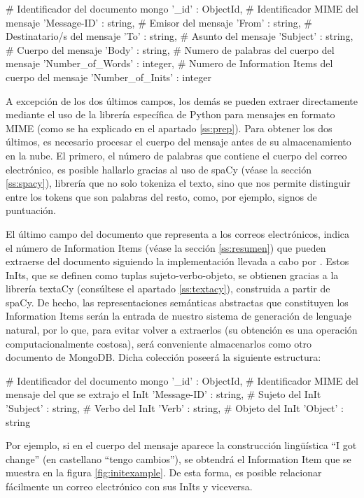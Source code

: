 \begin{python}
{
	# Identificador del documento mongo
	'_id' : ObjectId,
	# Identificador MIME del mensaje
	'Message-ID' : string,
	# Emisor del mensaje
	'From' : string,
	# Destinatario/s del mensaje
	'To' : string,
	# Asunto del mensaje
	'Subject' : string,
	# Cuerpo del mensaje
	'Body' : string,
	# Numero de palabras del cuerpo del mensaje
	'Number_of_Words' : integer,
	# Numero de Information Items del cuerpo del mensaje
	'Number_of_Inits' : integer
}
\end{python}

A excepción de los dos últimos campos, los demás se pueden extraer directamente mediante el uso de la librería específica de Python para mensajes en formato MIME (como se ha explicado en el apartado \ref{ss:prep}). Para obtener los dos últimos, es necesario procesar el cuerpo del mensaje antes de su almacenamiento en la nube. El primero, el número de palabras que contiene el cuerpo del correo electrónico, es posible hallarlo gracias al uso de spaCy (véase la sección \ref{ss:spacy}), librería que no solo tokeniza el texto, sino que nos permite distinguir entre los tokens que son palabras del resto, como, por ejemplo, signos de puntuación.

El último campo del documento que representa a los correos electrónicos, indica el número de Information Items (véase la sección \ref{ss:resumen}) que pueden extraerse del documento siguiendo la implementación llevada a cabo por \cite{genest2010text}. Estos InIts, que se definen como tuplas sujeto-verbo-objeto, se obtienen gracias a la librería textaCy (consúltese el apartado \ref{ss:textacy}), construida a partir de spaCy. De hecho, las representaciones semánticas abstractas que constituyen los Information Items serán la entrada de nuestro sistema de generación de lenguaje natural, por lo que, para evitar volver a extraerlos (su obtención es una operación computacionalmente costosa), será conveniente almacenarlos como otro documento de MongoDB. Dicha colección poseerá la siguiente estructura:

\begin{python}
	{
		# Identificador del documento mongo
		'_id' : ObjectId,
		# Identificador MIME del mensaje del que se extrajo el InIt
		'Message-ID' : string,
		# Sujeto del InIt
		'Subject' : string,
		# Verbo del InIt
		'Verb' : string,
		# Objeto del InIt
		'Object' : string
	}
\end{python}

Por ejemplo, si en el cuerpo del mensaje aparece la construcción lingüística ``I got change'' (en castellano ``tengo cambios''), se obtendrá el Information Item que se muestra en la figura \ref{fig:initexample}. De esta forma, es posible relacionar fácilmente un correo electrónico con sus InIts y viceversa.

